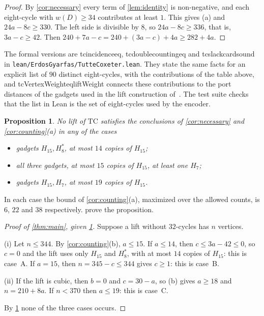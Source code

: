 \documentclass[11pt]{amsart}
\newtheorem{proposition}[theorem]{Proposition}
\theoremstyle{remark}
\newcommand{\leanus}{\textunderscore\allowbreak}
\newcommand{\lean}[1]{{\ttfamily\let\_\leanus #1}}
\newcommand{\code}[1]{\texttt{#1}}
\newcommand{\Hseven}{H_7}
\newcommand{\Hfifteen}{H_{15}}
\newcommand{\Height}{H_8^{*}}
\newcommand{\TC}{\mathrm{TC}}
\begin{document}
\begin{proof}
By \cref{cor:necessary} every term of \cref{lem:identity} is non-negative,
and each eight-cycle with $w(D)\ge 34$ contributes at least $1$. This gives (a)
and $24a-8c\ge 330$. The left side is divisible by $8$, so $24a-8c\ge 336$,
that is, $3a-c\ge 42$. Then $240+7a-c=240+(3a-c)+4a\ge 282+4a$.
\end{proof}

The formal versions are \lean{tc\_incidence\_eq\_8},
\lean{tc\_double\_counting\_eq} and \lean{tc\_slack\_card\_sound} in
\code{lean/ErdosGyarfas/TutteCoxeter.lean}. They state the same facts for an
explicit list of $90$ distinct eight-cycles, with the contributions of the
table above, and \lean{tcVertexWeight\_eq\_liftWeight} connects these
contributions to the port distances of the gadgets used in the lift
construction of~\cite{Marszalek2026a}. The test suite checks that the list in
Lean is the set of eight-cycles used by the encoder.

\begin{proposition}\label{prop:sat}
No lift of $\TC$ satisfies the conclusions of \cref{cor:necessary} and
\cref{cor:counting}(a) in any of the cases
\begin{itemize}[leftmargin=2.2em]
\item[\textsf{A}:] gadgets $\Hfifteen,\Height$, at most $14$ copies of $\Hfifteen$;
\item[\textsf{B}:] all three gadgets, at most $15$ copies of $\Hfifteen$, at least one $\Hseven$;
\item[\textsf{C}:] gadgets $\Hfifteen,\Hseven$, at most $19$ copies of $\Hfifteen$.
\end{itemize}
\end{proposition}

In each case the bound of \cref{cor:counting}(a), maximized over the allowed
counts, is $6$, $22$ and $38$ respectively. 
prove the proposition.

\begin{proof}[Proof of \cref{thm:main}, given \cref{prop:sat}]
Suppose a lift without $32$-cycles has $n$ vertices.

(i) Let $n\le 344$. By \cref{cor:counting}(b), $a\le 15$. If $a\le 14$, then
$c\le 3a-42\le 0$, so $c=0$ and the lift uses only $\Hfifteen$ and $\Height$,
with at most $14$ copies of $\Hfifteen$: this is case~\textsf{A}. If $a=15$,
then $n=345-c\le 344$ gives $c\ge 1$: this is case~\textsf{B}.

(ii) If the lift is cubic, then $b=0$ and $c=30-a$, so (b) gives $a\ge 18$ and
$n=210+8a$. If $n<370$ then $a\le 19$: this is case~\textsf{C}.

By \cref{prop:sat} none of the three cases occurs.
\end{proof}
\end{document}
